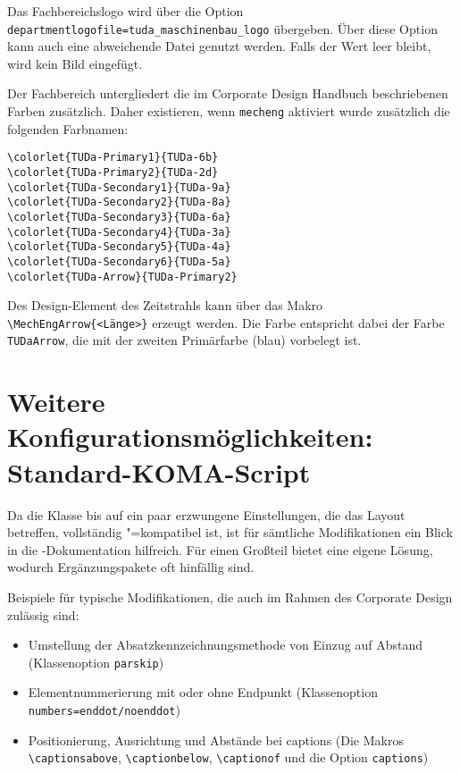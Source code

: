 \documentclass[
	ngerman,
	accentcolor=9c,%
	]{tudapub}
\let\code\texttt
\begin{document}
Das Fachbereichslogo wird über die Option \verb+departmentlogofile=tuda_maschinenbau_logo+ übergeben. Über diese Option kann auch eine abweichende Datei genutzt werden. Falls der Wert leer bleibt, wird kein Bild eingefügt.

Der Fachbereich untergliedert die im Corporate Design Handbuch beschriebenen Farben zusätzlich. Daher existieren, wenn \code{mecheng} aktiviert wurde zusätzlich die folgenden Farbnamen:

\begin{verbatim}
\colorlet{TUDa-Primary1}{TUDa-6b}
\colorlet{TUDa-Primary2}{TUDa-2d}
\colorlet{TUDa-Secondary1}{TUDa-9a}
\colorlet{TUDa-Secondary2}{TUDa-8a}
\colorlet{TUDa-Secondary3}{TUDa-6a}
\colorlet{TUDa-Secondary4}{TUDa-3a}
\colorlet{TUDa-Secondary5}{TUDa-4a}
\colorlet{TUDa-Secondary6}{TUDa-5a}
\colorlet{TUDa-Arrow}{TUDa-Primary2}
\end{verbatim}

Des Design-Element des Zeitstrahls kann über das Makro \verb+\MechEngArrow{<Länge>}+ erzeugt werden. Die Farbe entspricht dabei der Farbe \code{TUDaArrow}, die mit der zweiten Primärfarbe (blau) vorbelegt ist.

\section{Weitere Konfigurationsmöglichkeiten: Standard-KOMA-Script}
\label{sec:KOMA}
Da die Klasse bis auf ein paar erzwungene Einstellungen, die das Layout betreffen, vollständig \KOMAScript"=kompatibel ist, ist für sämtliche Modifikationen ein Blick in die \KOMAScript-Dokumentation hilfreich. Für einen Großteil bietet \KOMAScript{} eine eigene Lösung, wodurch Ergänzungspakete oft hinfällig sind.

Beispiele für typische Modifikationen, die auch im Rahmen des Corporate Design zulässig sind:
\begin{itemize}
	\item Umstellung der Absatzkennzeichnungsmethode von Einzug auf Abstand (Klassenoption \verb+parskip+)
	\item Elementnummerierung mit oder ohne Endpunkt (Klassenoption \verb+numbers=enddot/noenddot+)
	\item Positionierung, Ausrichtung und Abstände bei captions (Die Makros \verb+\captionsabove+, \verb+\captionbelow+, \verb+\captionof+ und die Option \verb+captions+)
\end{itemize}
\end{document}
